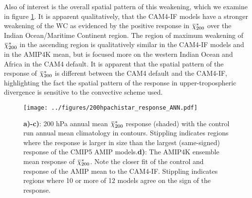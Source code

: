 \documentclass[letterpaper,12pt,titlepage,oneside,final]{book}
\newcommand{\overbar}[1]{\mkern 1.5mu\overline{\mkern-1.5mu#1\mkern-1.5mu}\mkern 1.5mu}
\begin{document}
Also of interest is the overall spatial pattern of this weakening, which we examine in figure \ref{fig:chi200response}. It is apparent qualitatively, that the CAM4-IF models have a stronger weakening of the WC as evidenced by the positive response in $\overbar{\chi}_{200}^{*}$ over the Indian Ocean/Maritime Continent region. The region of maximum weakening of $\overbar{\chi}_{200}^{*}$ in the ascending region is qualitatively similar in the CAM4-IF models and in the AMIP4K mean, but is focused more on the western Indian Ocean and Africa in the CAM4 default. It is apparent that the spatial pattern of the response of $\overbar{\chi}_{200}^{*}$ is different between the CAM4 default and the CAM4-IF, highlighting the fact the spatial pattern of the response in upper-tropospheric divergence is sensitive to the convective scheme used.
\begin{figure}[H]
\centering
\noindent\texttt{[image: ../figures/200hpachistar\_response\_ANN.pdf]}\hfill
\caption{\footnotesize \footnotesize \textbf{a)-c)}: 200 hPa annual mean $\overbar{\chi}^{*}_{200}$ response (shaded) with the control run annual mean climatology in contours. Stippling indicates regions where the response is larger in size than the largest (same-signed) response of the CMIP5 AMIP models.\textbf{d)}: The AMIP4K ensemble mean response of $\overbar{\chi}^{*}_{200}$. Note the closer fit of the control and response of the AMIP mean to the CAM4-IF. Stippling indicates regions where 10 or more of 12 models agree on the sign of the response.}
\label{fig:chi200response}
\end{figure}

\end{document}
